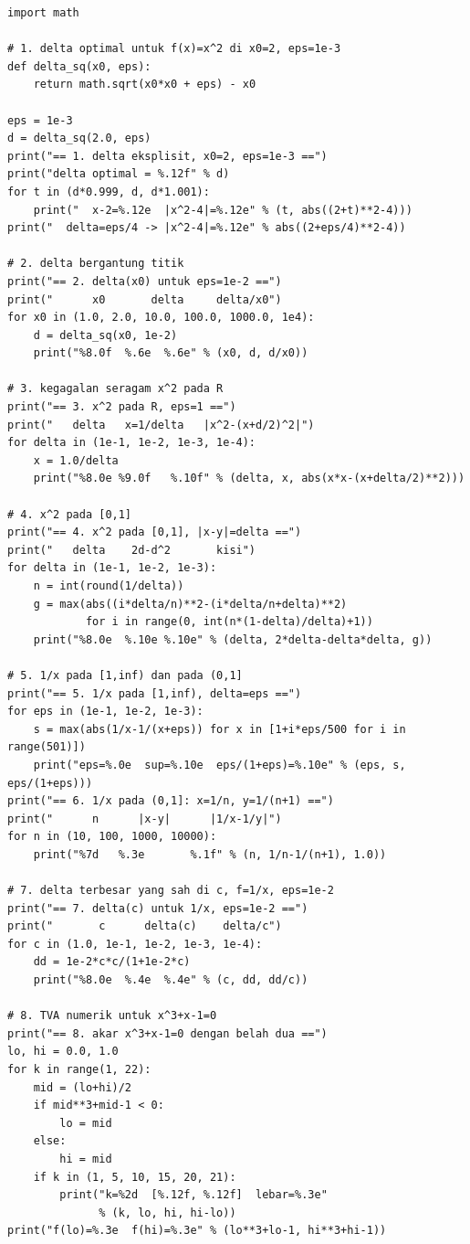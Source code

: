 \begin{lab}
\begin{verbatim}
import math

# 1. delta optimal untuk f(x)=x^2 di x0=2, eps=1e-3
def delta_sq(x0, eps):
    return math.sqrt(x0*x0 + eps) - x0

eps = 1e-3
d = delta_sq(2.0, eps)
print("== 1. delta eksplisit, x0=2, eps=1e-3 ==")
print("delta optimal = %.12f" % d)
for t in (d*0.999, d, d*1.001):
    print("  x-2=%.12e  |x^2-4|=%.12e" % (t, abs((2+t)**2-4)))
print("  delta=eps/4 -> |x^2-4|=%.12e" % abs((2+eps/4)**2-4))

# 2. delta bergantung titik
print("== 2. delta(x0) untuk eps=1e-2 ==")
print("      x0       delta     delta/x0")
for x0 in (1.0, 2.0, 10.0, 100.0, 1000.0, 1e4):
    d = delta_sq(x0, 1e-2)
    print("%8.0f  %.6e  %.6e" % (x0, d, d/x0))

# 3. kegagalan seragam x^2 pada R
print("== 3. x^2 pada R, eps=1 ==")
print("   delta   x=1/delta   |x^2-(x+d/2)^2|")
for delta in (1e-1, 1e-2, 1e-3, 1e-4):
    x = 1.0/delta
    print("%8.0e %9.0f   %.10f" % (delta, x, abs(x*x-(x+delta/2)**2)))

# 4. x^2 pada [0,1]
print("== 4. x^2 pada [0,1], |x-y|=delta ==")
print("   delta    2d-d^2       kisi")
for delta in (1e-1, 1e-2, 1e-3):
    n = int(round(1/delta))
    g = max(abs((i*delta/n)**2-(i*delta/n+delta)**2)
            for i in range(0, int(n*(1-delta)/delta)+1))
    print("%8.0e  %.10e %.10e" % (delta, 2*delta-delta*delta, g))

# 5. 1/x pada [1,inf) dan pada (0,1]
print("== 5. 1/x pada [1,inf), delta=eps ==")
for eps in (1e-1, 1e-2, 1e-3):
    s = max(abs(1/x-1/(x+eps)) for x in [1+i*eps/500 for i in range(501)])
    print("eps=%.0e  sup=%.10e  eps/(1+eps)=%.10e" % (eps, s, eps/(1+eps)))
print("== 6. 1/x pada (0,1]: x=1/n, y=1/(n+1) ==")
print("      n      |x-y|      |1/x-1/y|")
for n in (10, 100, 1000, 10000):
    print("%7d   %.3e       %.1f" % (n, 1/n-1/(n+1), 1.0))

# 7. delta terbesar yang sah di c, f=1/x, eps=1e-2
print("== 7. delta(c) untuk 1/x, eps=1e-2 ==")
print("       c      delta(c)    delta/c")
for c in (1.0, 1e-1, 1e-2, 1e-3, 1e-4):
    dd = 1e-2*c*c/(1+1e-2*c)
    print("%8.0e  %.4e  %.4e" % (c, dd, dd/c))

# 8. TVA numerik untuk x^3+x-1=0
print("== 8. akar x^3+x-1=0 dengan belah dua ==")
lo, hi = 0.0, 1.0
for k in range(1, 22):
    mid = (lo+hi)/2
    if mid**3+mid-1 < 0:
        lo = mid
    else:
        hi = mid
    if k in (1, 5, 10, 15, 20, 21):
        print("k=%2d  [%.12f, %.12f]  lebar=%.3e"
              % (k, lo, hi, hi-lo))
print("f(lo)=%.3e  f(hi)=%.3e" % (lo**3+lo-1, hi**3+hi-1))
\end{verbatim}
\end{lab}

